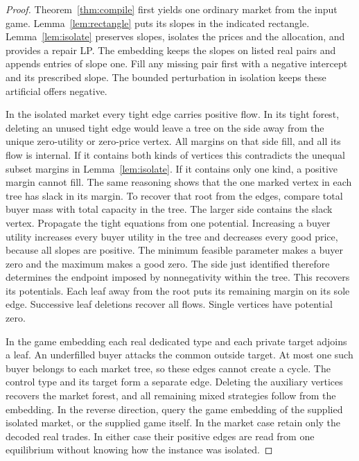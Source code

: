 \documentclass[11pt,oneside,openany,notitlepage]{report}
\begin{document}
\begin{proof}
Theorem~\ref{thm:compile} first yields one ordinary market from the input
game. Lemma~\ref{lem:rectangle} puts its slopes in the indicated rectangle.
Lemma~\ref{lem:isolate} preserves slopes, isolates the prices and the
allocation, and provides a repair LP. The embedding keeps the slopes on
listed real pairs and appends entries of slope one. Fill any missing pair
first with a negative intercept and its prescribed slope. The bounded
perturbation in isolation keeps these artificial offers negative.

In the isolated market every tight edge carries positive flow. In its
tight forest, deleting an unused tight edge would leave a tree on the
side away from the unique zero-utility or zero-price vertex. All margins
on that side fill, and all its flow is internal. If it contains both kinds
of vertices this contradicts the unequal subset margins in
Lemma~\ref{lem:isolate}. If it contains only one kind, a positive margin
cannot fill. The same reasoning shows that the one marked vertex in each
tree has slack in its margin. To recover that root from the edges, compare
total buyer mass with total capacity in the tree. The larger side contains
the slack vertex. Propagate the
tight equations from one potential. Increasing a buyer utility increases
every buyer utility in the tree and decreases every good price, because
all slopes are positive. The minimum feasible parameter makes a buyer
zero and the maximum makes a good zero. The side just identified therefore
determines the endpoint imposed by nonnegativity within the tree. This
recovers its potentials. Each leaf away from the root puts its remaining
margin on its sole edge. Successive leaf deletions recover all flows.
Single vertices have potential zero.

In the game embedding each real dedicated type and each private target
adjoins a leaf. An underfilled buyer attacks the common outside target.
At most one such buyer belongs to each market tree, so these edges cannot
create a cycle. The control type and its target form a separate edge.
Deleting the auxiliary vertices recovers the market forest, and all
remaining mixed strategies follow from the embedding. In the reverse direction, query the game embedding of the supplied
isolated market, or the supplied game itself. In the market case retain
only the decoded real trades. In either case their positive edges are
read from one equilibrium without knowing how the instance was isolated.
\end{proof}
\end{document}
